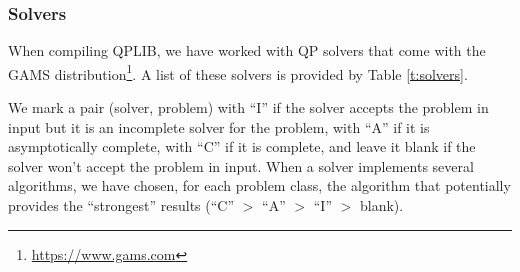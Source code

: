 \subsubsection{Solvers}\label{subsec:solver}

When compiling QPLIB, we have worked with QP solvers that come with the GAMS distribution\footnote{\url{https://www.gams.com}}.
A list of these solvers is provided by Table \ref{t:solvers}.

We mark a pair (solver, problem) with ``I'' if the solver accepts the problem in input but it is an incomplete solver for the problem, with ``A'' if it is asymptotically complete, with ``C'' if it is complete, and leave it blank if the solver won't accept the problem in input.
When a solver implements several algorithms, we have chosen, for each problem class, the algorithm that potentially provides the ``strongest'' results (``C'' $>$ ``A'' $>$ ``I'' $>$ blank).

